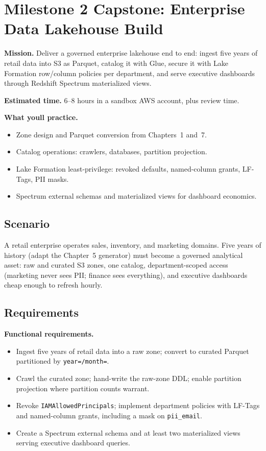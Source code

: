 \section{Milestone 2 Capstone: Enterprise Data Lakehouse Build}\label{sec:ch8-capstone}

\begin{capstonebox}
\textbf{Mission.} Deliver a governed enterprise lakehouse end to end: ingest five years of retail data into S3 as Parquet, catalog it with Glue, secure it with Lake Formation row/column policies per department, and serve executive dashboards through Redshift Spectrum materialized views.

\textbf{Estimated time.} 6--8 hours in a sandbox AWS account, plus review time.

\textbf{What you\textquotesingle{}ll practice.}
\begin{itemize}
    \item Zone design and Parquet conversion from Chapters~1 and~7.
    \item Catalog operations: crawlers, databases, partition projection.
    \item Lake Formation least-privilege: revoked defaults, named-column grants, LF-Tags, PII masks.
    \item Spectrum external schemas and materialized views for dashboard economics.
\end{itemize}
\end{capstonebox}

\subsection*{Scenario}
A retail enterprise operates sales, inventory, and marketing domains. Five years of history (adapt the Chapter~5 generator) must become a governed analytical asset: raw and curated S3 zones, one catalog, department-scoped access (marketing never sees PII; finance sees everything), and executive dashboards cheap enough to refresh hourly.

\subsection*{Requirements}
\textbf{Functional requirements.}
\begin{itemize}
    \item Ingest five years of retail data into a raw zone; convert to curated Parquet partitioned by \texttt{year=/month=}.
    \item Crawl the curated zone; hand-write the raw-zone DDL; enable partition projection where partition counts warrant.
    \item Revoke \texttt{IAMAllowedPrincipals}; implement department policies with LF-Tags and named-column grants, including a mask on \texttt{pii\_email}.
    \item Create a Spectrum external schema and at least two materialized views serving executive dashboard queries.
\end{itemize}

